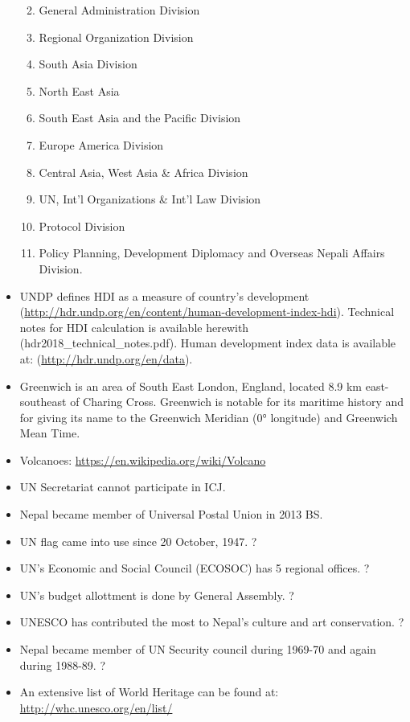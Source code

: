 \documentclass[
  openany]{book}
\providecommand{\tightlist}{%
  \setlength{\itemsep}{0pt}\setlength{\parskip}{0pt}}
\begin{document}
\begin{itemize}
  \begin{enumerate}
  \def\labelenumi{\arabic{enumi}.}
  \tightlist
  \item
    General Administration Division
  \item
    Regional Organization Division
  \item
    South Asia Division
  \item
    North East Asia
  \item
    South East Asia and the Pacific Division
  \item
    Europe America Division
  \item
    Central Asia, West Asia \& Africa Division
  \item
    UN, Int'l Organizations \& Int'l Law Division
  \item
    Protocol Division
  \item
    Policy Planning, Development Diplomacy and Overseas Nepali Affairs Division.
  \end{enumerate}
\item
  UNDP defines HDI as a measure of country's development (\url{http://hdr.undp.org/en/content/human-development-index-hdi}). Technical notes for HDI calculation is available herewith (hdr2018\_technical\_notes.pdf). Human development index data is available at: (\url{http://hdr.undp.org/en/data}).
\item
  Greenwich is an area of South East London, England, located 8.9 km east-southeast of Charing Cross. Greenwich is notable for its maritime history and for giving its name to the Greenwich Meridian (0° longitude) and Greenwich Mean Time.
\item
  Volcanoes: \url{https://en.wikipedia.org/wiki/Volcano}
\item
  UN Secretariat cannot participate in ICJ.
\item
  Nepal became member of Universal Postal Union in 2013 BS.
\item
  UN flag came into use since 20 October, 1947. ?
\item
  UN's Economic and Social Council (ECOSOC) has 5 regional offices. ?
\item
  UN's budget allottment is done by General Assembly. ?
\item
  UNESCO has contributed the most to Nepal's culture and art conservation. ?
\item
  Nepal became member of UN Security council during 1969-70 and again during 1988-89. ?
\item
  An extensive list of World Heritage can be found at: \url{http://whc.unesco.org/en/list/}

\end{itemize}
\end{document}
